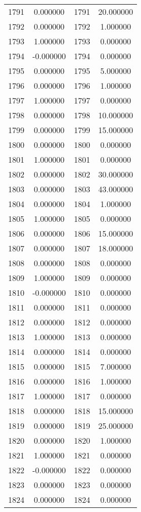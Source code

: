 \documentclass[12pt]{article}
\begin{document}
\begin{longtable}{@{}cccc@{}}
1791 & 0.000000 & 1791 & 20.000000 \\
1792 & 0.000000 & 1792 & 1.000000 \\
1793 & 1.000000 & 1793 & 0.000000 \\
1794 & -0.000000 & 1794 & 0.000000 \\
1795 & 0.000000 & 1795 & 5.000000 \\
1796 & 0.000000 & 1796 & 1.000000 \\
1797 & 1.000000 & 1797 & 0.000000 \\
1798 & 0.000000 & 1798 & 10.000000 \\
1799 & 0.000000 & 1799 & 15.000000 \\
1800 & 0.000000 & 1800 & 0.000000 \\
1801 & 1.000000 & 1801 & 0.000000 \\
1802 & 0.000000 & 1802 & 30.000000 \\
1803 & 0.000000 & 1803 & 43.000000 \\
1804 & 0.000000 & 1804 & 1.000000 \\
1805 & 1.000000 & 1805 & 0.000000 \\
1806 & 0.000000 & 1806 & 15.000000 \\
1807 & 0.000000 & 1807 & 18.000000 \\
1808 & 0.000000 & 1808 & 0.000000 \\
1809 & 1.000000 & 1809 & 0.000000 \\
1810 & -0.000000 & 1810 & 0.000000 \\
1811 & 0.000000 & 1811 & 0.000000 \\
1812 & 0.000000 & 1812 & 0.000000 \\
1813 & 1.000000 & 1813 & 0.000000 \\
1814 & 0.000000 & 1814 & 0.000000 \\
1815 & 0.000000 & 1815 & 7.000000 \\
1816 & 0.000000 & 1816 & 1.000000 \\
1817 & 1.000000 & 1817 & 0.000000 \\
1818 & 0.000000 & 1818 & 15.000000 \\
1819 & 0.000000 & 1819 & 25.000000 \\
1820 & 0.000000 & 1820 & 1.000000 \\
1821 & 1.000000 & 1821 & 0.000000 \\
1822 & -0.000000 & 1822 & 0.000000 \\
1823 & 0.000000 & 1823 & 0.000000 \\
1824 & 0.000000 & 1824 & 0.000000 \\

\end{longtable}
\end{document}
